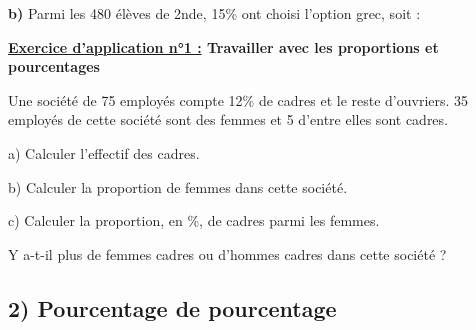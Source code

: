 \documentclass[12pt]{article}
\begin{document}
\vspace{20pt}

\hspace{0.5cm} \textbf{b)} Parmi les 480 élèves de 2nde, 15\% ont choisi l’option grec, soit : 

\vspace{4cm}

\begin{mdframed}[
    linewidth=1pt,
    linecolor=RoyalBlue,
    innertopmargin=10pt,
    innerbottommargin=10pt
]
{\color{RoyalBlue}\textbf{\underline{Exercice d'application n°1 :} 
Travailler avec les proportions et pourcentages}}
\vspace{10pt}

Une société de 75 employés compte 12\% de cadres et le reste d’ouvriers.
35 employés de cette société sont des femmes et 5 d’entre elles sont cadres.

\hspace{1cm} a) Calculer l’effectif des cadres.

\hspace{1cm} b) Calculer la proportion de femmes dans cette société.

\newpage
\hspace{1cm} c) Calculer la proportion, en \%, de cadres parmi les femmes.

\hspace{1.5cm} Y a-t-il plus de femmes cadres ou d'hommes cadres dans cette société ?

\vspace{0.5cm}
{\color{black!27}\dotfill}

\vspace{0.5cm}
{\color{black!27}\dotfill}

\vspace{0.5cm}
{\color{black!27}\dotfill}

\vspace{0.5cm}
{\color{black!27}\dotfill}

\vspace{0.5cm}
{\color{black!27}\dotfill}

\end{mdframed}


\vspace{10pt}

\subsection*{\hspace{1cm} 2) Pourcentage de pourcentage}
\end{document}
